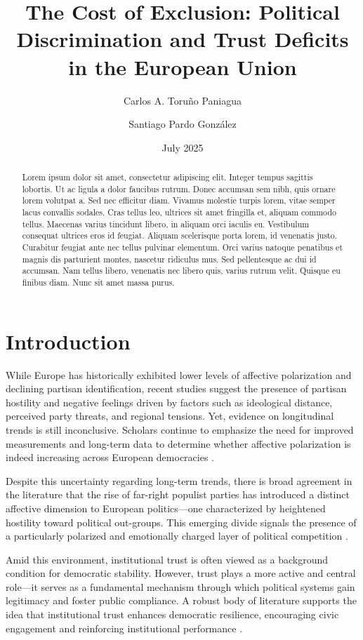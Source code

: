 \documentclass{article}
\title{The Cost of Exclusion: Political Discrimination and Trust Deficits in the European Union}
\author{Carlos A. Toruño Paniagua}
\author{Santiago Pardo González}
\affil{\emph{The World Justice Project}}
\date{July 2025}
\begin{document}
\maketitle

\begin{abstract}
Lorem ipsum dolor sit amet, consectetur adipiscing elit. Integer tempus sagittis lobortis. Ut ac ligula a dolor faucibus rutrum. Donec accumsan sem nibh, quis ornare lorem volutpat a. Sed nec efficitur diam. Vivamus molestie turpis lorem, vitae semper lacus convallis sodales. Cras tellus leo, ultrices sit amet fringilla et, aliquam commodo tellus. Maecenas varius tincidunt libero, in aliquam orci iaculis eu. Vestibulum consequat ultrices eros id feugiat. Aliquam scelerisque porta lorem, id venenatis justo. Curabitur feugiat ante nec tellus pulvinar elementum. Orci varius natoque penatibus et magnis dis parturient montes, nascetur ridiculus mus. Sed pellentesque ac dui id accumsan. Nam tellus libero, venenatis nec libero quis, varius rutrum velit. Quisque eu finibus diam. Nunc sit amet massa purus.
\end{abstract}

\section{Introduction}

While Europe has historically exhibited lower levels of affective polarization and declining partisan identification, recent studies suggest the presence of partisan hostility and negative feelings driven by factors such as ideological distance, perceived party threats, and regional tensions. Yet, evidence on longitudinal trends is still inconclusive. Scholars continue to emphasize the need for improved measurements and long-term data to determine whether affective polarization is indeed increasing across European democracies \textcite{wagner_affective_2024}.

Despite this uncertainty regarding long-term trends, there is broad agreement in the literature that the rise of far-right populist parties has introduced a distinct affective dimension to European politics—one characterized by heightened hostility toward political out-groups. This emerging divide signals the presence of a particularly polarized and emotionally charged layer of political competition \parencite{reiljan_fear_2020, reiljan_andres_affective_2025}.

Amid this environment, institutional trust is often viewed as a background condition for democratic stability. However, trust plays a more active and central role—it serves as a fundamental mechanism through which political systems gain legitimacy and foster public compliance. A robust body of literature supports the idea that institutional trust enhances democratic resilience, encouraging civic engagement and reinforcing institutional performance \parencite{marien_measuring_2011, devine_stability_2024}.
\end{document}
